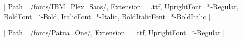 \usepackage[]{units}
\usepackage{listings}
\usepackage{multicol}
\usepackage{tcolorbox}
\usepackage{physics}

\beamertemplatenavigationsymbolsempty




\setmainfont{IBMPlexSans}[
  Path=./fonts/IBM_Plex_Sans/,
  Extension = .ttf,
  UprightFont=*-Regular,
  BoldFont=*-Bold,
  ItalicFont=*-Italic,
  BoldItalicFont=*-BoldItalic
  ]

\setsansfont{PatuaOne}[
  Path=./fonts/Patua_One/,
  Extension = .ttf,
  UprightFont=*-Regular
  ]
